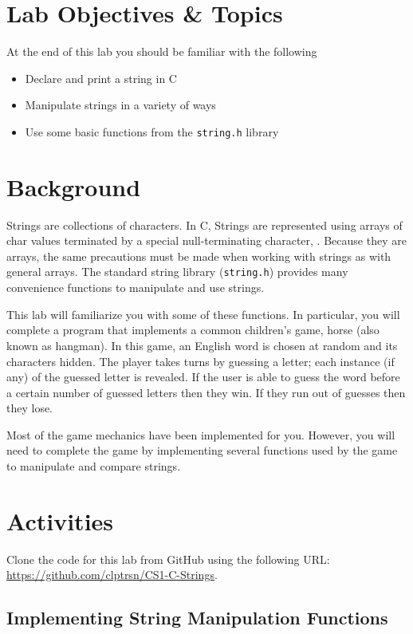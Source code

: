 \documentclass[12pt]{scrartcl}
\begin{document}
\section{Lab Objectives \& Topics}
At the end of this lab you should be familiar with the following
\begin{itemize}
  \item Declare and print a string in C
  \item Manipulate strings in a variety of ways
  \item Use some basic functions from the \texttt{string.h} library
\end{itemize}

\section{Background}

Strings are collections of characters.  In C, Strings are represented using 
arrays of char values terminated by a special null-terminating character, 
\texttt{\0}.  Because they are arrays, the same precautions must 
be made when working with strings as with general arrays.  The standard 
string library (\texttt{string.h}) provides many convenience 
functions to manipulate and use strings.

This lab will familiarize you with some of these functions.  In particular, 
you will complete a program that implements a common children's game, 
horse (also known as hangman).  In this game, an English word is chosen 
at random and its characters hidden.  The player takes turns by guessing 
a letter; each instance (if any) of the guessed letter is revealed.  If the 
user is able to guess the word before a certain number of guessed letters 
then they win.  If they run out of guesses then they lose.

Most of the game mechanics have been implemented for you.  However, 
you will need to complete the game by implementing several functions 
used by the game to manipulate and compare strings.

\section{Activities}

Clone the code for this lab from GitHub using the following URL: 
\url{https://github.com/clptrsn/CS1-C-Strings}.

\subsection{Implementing String Manipulation Functions}
\end{document}
